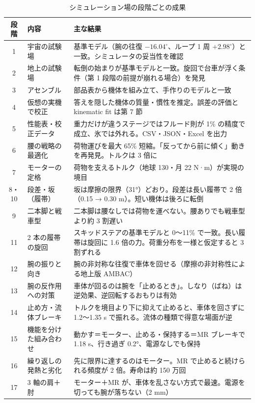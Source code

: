 \documentclass[paper=a4paper,fontsize=10pt,twocolumn,column_gap=2zw,line_length=24zw,number_of_lines=46,head_space=20mm]{jlreq}
\begin{document}
\begin{table}[t]\centering\small
\caption{シミュレーション場の段階ごとの成果}\label{tab:stages}
\setlength{\tabcolsep}{4pt}
\begin{tabular}{clp{}}\toprule
段階 & 内容 & 主な結果 \\\midrule
1 & 宇宙の試験場 & 基準モデル（腕の往復 $-16.04^\circ$、ループ 1 周 $+2.98^\circ$）と一致。シミュレータの妥当性を確認 \\
2 & 地上の試験場 & 転倒の始まりが基準モデルと一致。旋回で台車が浮く条件（第 1 段階の前提が崩れる場合）を発見 \\
3 & アセンブル & 部品表から機体を組み立て、手作りのモデルと一致 \\
4 & 仮想の実機で校正 & 答えを隠した機体の質量・慣性を推定。誤差の評価と kinematic fit は第 7 節 \\
5 & 性能表・校正データ & 重力だけが違うステージではフルード則が 1\% の精度で成立、氷では外れる。CSV・JSON・Excel を出力 \\
6 & 腰の戦略の最適化 & 荷物運びを最大 65\% 短縮。「反ってから前に傾く」動きを再発見。トルクは 3 倍に \\
7 & モーターの定格 & 荷物を支えるトルク（地球 130・月 22 N·m）が実現の境目 \\
8・10 & 段差・坂（履帯） & 坂は摩擦の限界（31°）どおり。段差は長い履帯で 2 倍（0.15 → 0.30 m）。短い機体は後ろに転倒 \\
9 & 二本脚と戦車型 & 二本脚は腰なしでは荷物を運べない。腰ありでも戦車型より約 3 割遅い \\
11 & 2 本の履帯の旋回 & スキッドステアの基準モデルと 0〜11\% で一致。長い履帯は旋回に 1.6 倍の力。荷重分布を一様と仮定すると 3 割ずれる \\
12 & 腕の振りと向き & 腕の非対称な往復で車体を回せる（摩擦の非対称性による地上版 AMBAC） \\
13 & 腕の反作用への対策 & 車体が回るのは腕を「止めるとき」。しなり（ばね）は逆効果、逆回転するおもりは有効 \\
14 & 止め方・流体ブレーキ & トルクを境目より下に抑えて止めると、車体を回さずに 1.2〜1.35 s で振れる。流体の種類で得意な場面が逆 \\
15 & 機能を分けた組み合わせ & 動かす＝モーター、止める・保持する＝MR ブレーキで 1.18 s、行き過ぎ 0.2°、電源なしでも保持 \\
16 & 繰り返しの発熱と劣化 & 先に限界に達するのはモーター。MR で止めると続けられる頻度が 2 倍。寿命は約 150 万回 \\
17 & 3 軸の肩＋肘 & モーター＋MR が、車体を乱さない方式で最速。電源を切っても腕が落ちない（2 mm） \\\bottomrule
\end{tabular}
\end{table}
\end{document}
